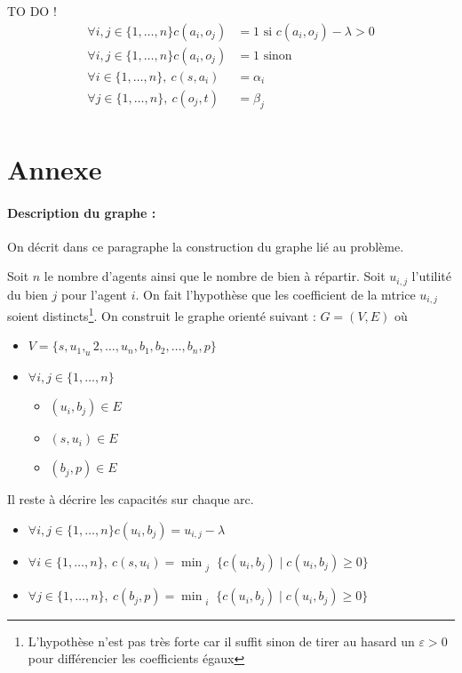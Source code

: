 \documentclass[a4paper, titlepage, oneside, 12pt]{article}%
\begin{document}
TO DO !
\begin{align*}
\forall i,j \in \{1, \dots, n\} c(a_i,o_j)&=1 \mbox{ si } c(a_i,o_j)-\lambda>0\\
\forall i,j \in \{1, \dots, n\} c(a_i,o_j)&=1 \mbox{ sinon}\\
\forall i \in \{1, \dots, n\},\ c(s,a_i)&=\alpha_i\\
\forall j \in \{1, \dots, n\},\ c(o_j,t)&=\beta_j\\
\end{align*}
\section{Annexe}

\paragraph{Description du graphe : } On décrit dans ce paragraphe la construction du graphe lié au problème. 

Soit $n$ le nombre d'agents ainsi que le nombre de bien à répartir. Soit $u_{i,j}$ l'utilité du bien $j$ pour l'agent $i$. 
On fait l'hypothèse que les coefficient de la mtrice $u_{i,j}$ soient distincts\footnote{L'hypothèse n'est pas très forte car il suffit sinon de tirer au hasard un $\varepsilon>0$ pour différencier les coefficients égaux}. 
On construit le graphe orienté suivant :
$G=(V,E)$ où 
\begin{itemize}
\item $V=\{s,u_1,_u2,\dots, u_n, b_1,b_2,\dots, b_n,p\}$
\item $\forall i,j \in \{1,\dots, n\} $
  \begin{itemize}
  \item $(u_i,b_j)\in E $
  \item $(s,u_i)\in E$
  \item $(b_j,p) \in E$
  \end{itemize}
\end{itemize}  

Il reste à décrire les capacités sur chaque arc. 
\begin{itemize}
\item  $\forall i,j \in \{1, \dots, n\} c(u_i,b_j)=u_{i,j}-\lambda$
\item $\forall i \in \{1, \dots, n\},\ c(s,u_i)=\min_{\substack{j}} \{c(u_i,b_j) \mid c(u_i,b_j)\geq 0\}$
\item $\forall j \in \{1, \dots, n\},\ c(b_j,p)=\min_{\substack{i}} \{c(u_i,b_j) \mid c(u_i,b_j)\geq 0\}$
\end{itemize}
\end{document}
